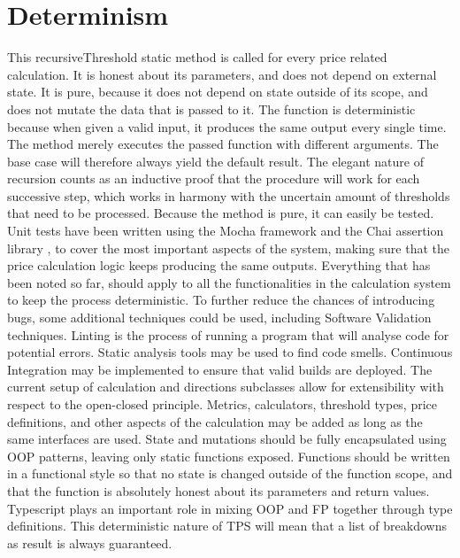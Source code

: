 \section{Determinism}
This recursiveThreshold static method is called for every price related calculation. It is honest about its parameters, and does not depend on external state. It is pure, because it does not depend on state outside of its scope, and does not mutate the data that is passed to it. The function is deterministic because when given a valid input, it produces the same output every single time. The method merely executes the passed function with different arguments. The base case will therefore always yield the default result. The elegant nature of recursion counts as an inductive proof that the procedure will work for each successive step, which works in harmony with the uncertain amount of thresholds that need to be processed. Because the method is pure, it can easily be tested. Unit tests have been written using the Mocha framework \cite{mocha} and the Chai assertion library \cite{chai}, to cover the most important aspects of the system, making sure that the price calculation logic keeps producing the same outputs. Everything that has been noted so far, should apply to all the functionalities in the calculation system to keep the process deterministic. To further reduce the chances of introducing bugs, some additional techniques could be used, including Software Validation techniques. Linting is the process of running a program that will analyse code for potential errors. Static analysis tools may be used to find code smells. Continuous Integration may be implemented to ensure that valid builds are deployed. The current setup of calculation and directions subclasses allow for extensibility with respect to the open-closed principle. Metrics, calculators, threshold types, price definitions, and other aspects of the calculation may be added as long as the same interfaces are used. State and mutations should be fully encapsulated using OOP patterns, leaving only static functions exposed. Functions should be written in a functional style so that no state is changed outside of the function scope, and that the function is absolutely honest about its parameters and return values. Typescript plays an important role in mixing OOP and FP together through type definitions. This deterministic nature of TPS will mean that a list of breakdowns as result is always guaranteed.

